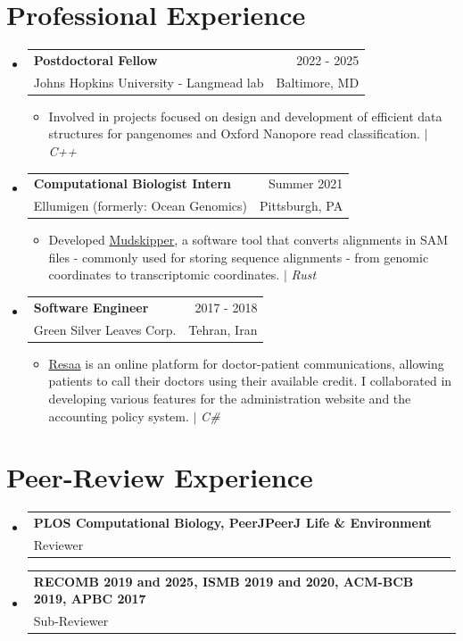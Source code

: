 \documentclass[A4,11pt]{article}
\makeatletter
\newcommand{\CVItem}[1]{
  \item\small{
    {#1 \vspace{-2pt}}
  }
}
\newcommand{\CVSubheading}[4]{
  \vspace{-2pt}\item
    \begin{tabular*}{0.97\textwidth}[t]{l@{\extracolsep{\fill}}r}
      \textbf{#1} & #2 \\
      \small#3 & \small #4 \\
    \end{tabular*}\vspace{-7pt}
}
\newcommand{\CVSubHeadingListStart}{\begin{itemize}[leftmargin=0.5cm, label={}]}
\newcommand{\CVSubHeadingListEnd}{\end{itemize}}
\newcommand{\CVItemListStart}{\begin{itemize}}
\newcommand{\CVItemListEnd}{\end{itemize}\vspace{-5pt}}
\makeatother
\begin{document}
\section{Professional Experience}
  \CVSubHeadingListStart
    \CVSubheading{Postdoctoral Fellow}{2022 - 2025}
      {Johns Hopkins University - Langmead lab}{Baltimore, MD}
      \CVItemListStart
        \CVItem{Involved in projects focused on design and development of efficient data structures for pangenomes and Oxford Nanopore read classification. $|$ \emph{\small{C++}}}
      \CVItemListEnd
    \CVSubheading
      {Computational Biologist Intern}{Summer 2021} %
      {Ellumigen (formerly:  Ocean Genomics)}{Pittsburgh, PA}
      \CVItemListStart
        \CVItem{Developed \href{https://github.com/OceanGenomics/mudskipper}{Mudskipper}, a software tool that converts alignments in SAM files - commonly used for storing
sequence alignments - from genomic coordinates to transcriptomic coordinates. $|$ \emph{\small{Rust}}}
      \CVItemListEnd
    \CVSubheading
      {Software Engineer}{2017 - 2018} %
      {Green Silver Leaves Corp.}{Tehran, Iran}
      \CVItemListStart
        \CVItem{\href{https://resaa.net/}{Resaa} is an online platform for doctor-patient communications, allowing patients to call
        their doctors using their available credit. I collaborated in developing various features for the administration website and the accounting
        policy system. $|$ \emph{\small{C\#}}}
      \CVItemListEnd
  \CVSubHeadingListEnd

\section{Peer-Review Experience}
\CVSubHeadingListStart
\CVSubheading {PLOS Computational Biology, PeerJPeerJ Life \& Environment}{}{Reviewer}{}
\CVSubheading {RECOMB 2019 and 2025, ISMB 2019 and 2020, ACM-BCB 2019, APBC 2017}{}{Sub-Reviewer}{}
\CVSubHeadingListEnd
\end{document}
